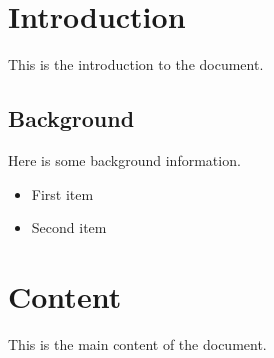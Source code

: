 
\section{Introduction}
This is the introduction to the document.

\subsection{Background}
Here is some background information.

\begin{itemize}
    \item First item
    \item Second item
\end{itemize}

\section{Content}
This is the main content of the document.
